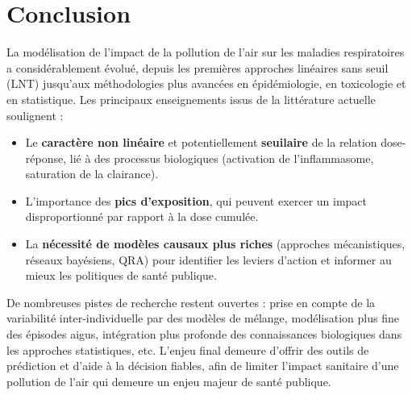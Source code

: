 \section{Conclusion}
\label{sec:Conclusion}
La modélisation de l'impact de la pollution de l'air sur les maladies respiratoires a considérablement évolué, depuis les premières approches linéaires sans seuil (LNT) jusqu’aux méthodologies plus avancées en épidémiologie, en toxicologie et en statistique. Les principaux enseignements issus de la littérature actuelle soulignent :
\begin{itemize}
    \item Le \textbf{caractère non linéaire} et potentiellement \textbf{seuilaire} de la relation dose-réponse, lié à des processus biologiques (activation de l’inflammasome, saturation de la clairance).
    \item L'importance des \textbf{pics d’exposition}, qui peuvent exercer un impact disproportionné par rapport à la dose cumulée.
    \item La \textbf{nécessité de modèles causaux plus riches} (approches mécanistiques, réseaux bayésiens, QRA) pour identifier les leviers d’action et informer au mieux les politiques de santé publique.
\end{itemize}

De nombreuses pistes de recherche restent ouvertes : prise en compte de la variabilité inter-individuelle par des modèles de mélange, modélisation plus fine des épisodes aigus, intégration plus profonde des connaissances biologiques dans les approches statistiques, etc. L’enjeu final demeure d’offrir des outils de prédiction et d’aide à la décision fiables, afin de limiter l’impact sanitaire d’une pollution de l’air qui demeure un enjeu majeur de santé publique.



